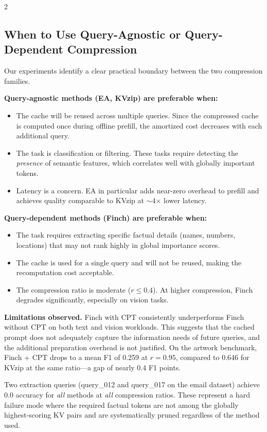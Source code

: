 \documentclass[10pt,a4paper]{article}
\begin{document}
\begin{multicols}{2}
\subsection{When to Use Query-Agnostic or Query-Dependent Compression}

Our experiments identify a clear practical boundary between the two
compression families.

\textbf{Query-agnostic methods (EA, KVzip) are preferable when:}
\begin{itemize}
  \item The cache will be reused across multiple queries. Since the
    compressed cache is computed once during offline prefill, the
    amortized cost decreases with each additional query.
  \item The task is classification or filtering. These tasks require
    detecting the \emph{presence} of semantic features, which correlates
    well with globally important tokens.
  \item Latency is a concern. EA in particular adds near-zero overhead
    to prefill and achieves quality comparable to KVzip at
    $\sim$4$\times$ lower latency.
\end{itemize}

\textbf{Query-dependent methods (Finch) are preferable when:}
\begin{itemize}
  \item The task requires extracting specific factual details (names,
    numbers, locations) that may not rank highly in global importance
    scores.
  \item The cache is used for a single query and will not be reused,
    making the recomputation cost acceptable.
  \item The compression ratio is moderate ($r \leq 0.4$). At higher
    compression, Finch degrades significantly, especially on vision
    tasks.
\end{itemize}

\textbf{Limitations observed.}
Finch with CPT consistently underperforms Finch without CPT on both text
and vision workloads. This suggests that the cached prompt does not
adequately capture the information needs of future queries, and the
additional preparation overhead is not justified. On the artwork
benchmark, Finch + CPT drops to a mean F1 of 0.259 at $r=0.95$,
compared to 0.646 for KVzip at the same ratio---a gap of nearly 0.4 F1
points.

Two extraction queries (query\_012 and query\_017 on the email dataset)
achieve 0.0 accuracy for \emph{all} methods at \emph{all} compression
ratios. These represent a hard failure mode where the required factual
tokens are not among the globally highest-scoring KV pairs and are
systematically pruned regardless of the method used.


\end{multicols}
\end{document}

